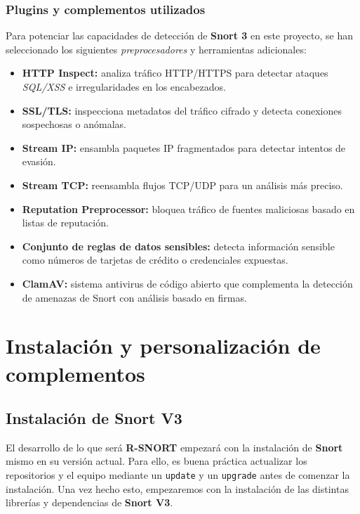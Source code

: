 \documentclass[12pt,a4paper]{report}
\begin{document}
\subsubsection{Plugins y complementos utilizados}
Para potenciar las capacidades de detección de \textbf{Snort 3} en este proyecto, se han seleccionado los siguientes \textit{preprocesadores} y herramientas adicionales:

\begin{itemize}
	\item \textbf{HTTP Inspect:} analiza tráfico HTTP/HTTPS para detectar ataques \textit{SQL/XSS} e irregularidades en los encabezados.
	\item \textbf{SSL/TLS:} inspecciona metadatos del tráfico cifrado y detecta conexiones sospechosas o anómalas.
	\item \textbf{Stream IP:} ensambla paquetes IP fragmentados para detectar intentos de evasión.
	\item \textbf{Stream TCP:} reensambla flujos TCP/UDP para un análisis más preciso.
	\item \textbf{Reputation Preprocessor:} bloquea tráfico de fuentes maliciosas basado en listas de reputación. 
	\item \textbf{Conjunto de reglas de datos sensibles:} detecta información sensible como números de tarjetas de crédito o credenciales expuestas.
	\item \textbf{ClamAV:} sistema antivirus de código abierto que complementa la detección de amenazas de Snort con análisis basado en firmas.
\end{itemize}


\newpage

\section{Instalación y personalización de complementos}
\subsection{Instalación de Snort V3}
El desarrollo de lo que será \textbf{R-SNORT} empezará con la instalación de \textbf{Snort} \cite{snort3_installation_pdf} mismo en su versión actual. Para ello, es buena práctica actualizar los repositorios y el equipo mediante un \texttt{update} y un \texttt{upgrade} antes de comenzar la instalación. Una vez hecho esto, empezaremos con la instalación de las distintas librerías y dependencias de \textbf{Snort V3}.
\newline
\end{document}
